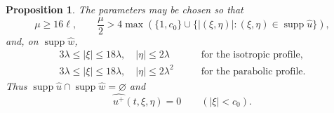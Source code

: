 \documentclass[12pt,reqno,letterpaper]{amsart}
\numberwithin{equation}{section}
\newtheorem{proposition}[theorem]{Proposition}
\theoremstyle{definition}
\newcommand{\la}{\lambda}
\newcommand{\supp}{\operatorname{supp}}
\newcommand{\abs}[1]{\left\lvert #1\right\rvert}
\begin{document}
\begin{proposition}
The parameters may be chosen so that
\begin{equation}\label{eq:cubic-Euclidean-onestep-separation}
 \mu\geq16\ell,
 \qquad
 \frac\mu2>
 4\max\left(\{1,c_0\}\cup
 \{\abs{(\xi,\eta)}:(\xi,\eta)\in\supp\widehat u\}\right),
\end{equation}
and, on $\supp\widehat w$,
\begin{equation}\label{eq:cubic-Euclidean-onestep-support}
 \begin{aligned}
 3\la\leq\abs\xi\leq18\la,\quad \abs\eta\leq2\la
 &\qquad\text{for the isotropic profile},\\
 3\la\leq\abs\xi\leq18\la,\quad \abs\eta\leq2\la^2
 &\qquad\text{for the parabolic profile}.
 \end{aligned}
\end{equation}
Thus $\supp\widehat u\cap\supp\widehat w=\varnothing$ and
\[
 \widehat{u^+}(t,\xi,\eta)=0\qquad(\abs\xi<c_0).
\]
\end{proposition}
\end{document}
